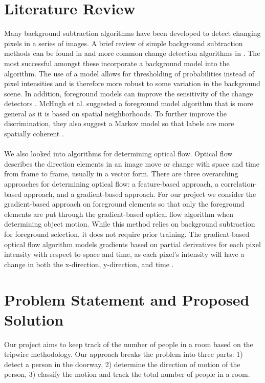 \documentclass[12pt,oneside]{article} %
\begin{document}
\section{Literature Review}  %
Many background subtraction algorithms have been developed to detect changing pixels in a series of images.
A brief review of simple background subtraction methods can be found in \cite{Piccardi04} and
more common change detection algorithms in \cite{Goyette14}.
The most successful amongst these incorporate a background model into the algorithm. The use of a model
allows for thresholding of probabilities instead of pixel intensities and is therefore more robust to some variation
in the background scene. In addition, foreground models can improve the sensitivity of the change detectors 
\cite{Elgammal02}. McHugh et al. suggested a foreground model algorithm that is more general as it
is based on spatial neighborhoods. To further improve the discrimination, they also suggest a Markov model
so that labels are more spatially coherent
\cite{Mchugh09}.
\\ \\
We also looked into algorithms for determining optical flow. Optical flow describes the direction elements in an image move or change with space and time from frame to frame, usually in a vector form. There are three overarching approaches for determining optical flow: a feature-based approach, a correlation-based approach, and a gradient-based approach. For our project we consider the gradient-based approach on foreground elements so that only the foreground elements are put through the gradient-based optical flow algorithm when determining object motion. While this method relies on background subtraction for foreground selection, it does not require prior training. The gradient-based optical flow algorithm models gradients based on partial derivatives for each pixel intensity with respect to space and time, as each pixel's intensity will have a change in both the x-direction, y-direction, and time \cite{Smith97}.

\section{Problem Statement and Proposed Solution}  %
Our project aims to keep track of the number of people in a room based on the tripwire methodology. Our approach breaks the problem into three parts: 1) detect a person in the doorway, 2) determine the direction of motion of the person, 3) classify the motion and track the total number of people in a room.
\end{document}
